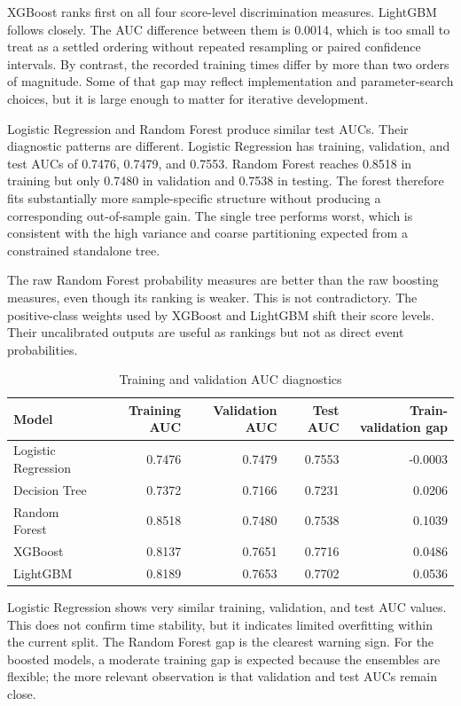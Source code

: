 \documentclass[11pt]{article}
\begin{document}
XGBoost ranks first on all four score-level discrimination measures. LightGBM follows closely. The AUC difference between them is 0.0014, which is too small to treat as a settled ordering without repeated resampling or paired confidence intervals. By contrast, the recorded training times differ by more than two orders of magnitude. Some of that gap may reflect implementation and parameter-search choices, but it is large enough to matter for iterative development.

Logistic Regression and Random Forest produce similar test AUCs. Their diagnostic patterns are different. Logistic Regression has training, validation, and test AUCs of 0.7476, 0.7479, and 0.7553. Random Forest reaches 0.8518 in training but only 0.7480 in validation and 0.7538 in testing. The forest therefore fits substantially more sample-specific structure without producing a corresponding out-of-sample gain. The single tree performs worst, which is consistent with the high variance and coarse partitioning expected from a constrained standalone tree.

The raw Random Forest probability measures are better than the raw boosting measures, even though its ranking is weaker. This is not contradictory. The positive-class weights used by XGBoost and LightGBM shift their score levels. Their uncalibrated outputs are useful as rankings but not as direct event probabilities.

\begin{table}[H]
\centering
\caption{Training and validation AUC diagnostics}
\small
\begin{tabular}{lrrrr}
\toprule
Model & Training AUC & Validation AUC & Test AUC & Train-validation gap \\
\midrule
Logistic Regression & 0.7476 & 0.7479 & 0.7553 & -0.0003 \\
Decision Tree & 0.7372 & 0.7166 & 0.7231 & 0.0206 \\
Random Forest & 0.8518 & 0.7480 & 0.7538 & 0.1039 \\
XGBoost & 0.8137 & 0.7651 & 0.7716 & 0.0486 \\
LightGBM & 0.8189 & 0.7653 & 0.7702 & 0.0536 \\
\bottomrule
\end{tabular}
\end{table}

Logistic Regression shows very similar training, validation, and test AUC values. This does not confirm time stability, but it indicates limited overfitting within the current split. The Random Forest gap is the clearest warning sign. For the boosted models, a moderate training gap is expected because the ensembles are flexible; the more relevant observation is that validation and test AUCs remain close.
\end{document}
